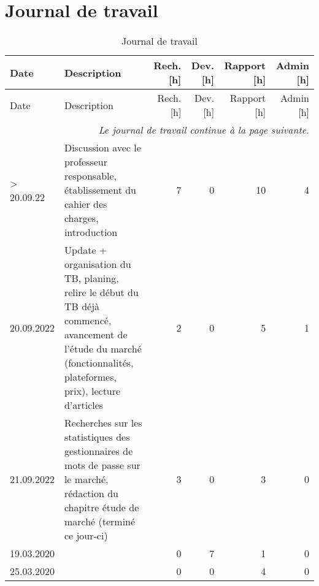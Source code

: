 

\chapter{Journal de travail}

\begin{landscape}

\begin{longtable}[c]{lp{10cm}rrrr}
    \caption{Journal de travail}\\

    \hline
    Date & Description & Rech. [h] & Dev. [h] & Rapport [h] & Admin [h] \\
    \hline
    \endfirsthead
    
    \hline
    Date & Description & Rech. [h] & Dev. [h] & Rapport [h] & Admin [h] \\
    \hline
    \endhead
    
    \multicolumn{6}{r}{\small \it Le journal de travail continue à la page suivante.} \\
    \normalsize
    \endfoot
    
    \hline
    \endlastfoot


    > 20.09.22
    & Discussion avec le professeur responsable, établissement du cahier des charges, introduction
    & 7 %
    & 0 %
    & 10 %
    & 4\\ %
    
	20.09.2022 
	& Update + organisation du TB, planing, relire le début du TB déjà commencé, avancement de l’étude du marché (fonctionnalités, plateformes, prix), lecture d’articles
	& 2 %
	& 0 %
	& 5 %
	& 1\\ %

	21.09.2022 
	& Recherches sur les statistiques des gestionnaires de mots de passe sur le marché, rédaction du chapitre étude de marché (terminé ce jour-ci)
	& 3 %
	& 0 %
	& 3 %
	& 0\\ %

	19.03.2020 
	& 
	& 0 %
	& 7 %
	& 1 %
	& 0\\ %

	25.03.2020 
	& 
	& 0 %
	& 0 %
	& 4 %
	& 0\\ %


\end{longtable}
\end{landscape}
